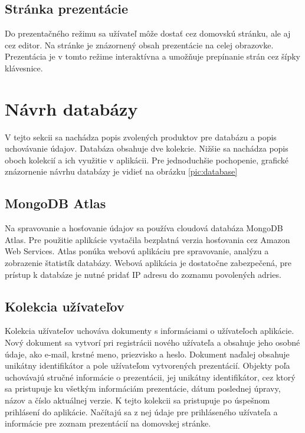\subsection*{Stránka prezentácie}
Do prezentačného režimu sa užívateľ môže dostať cez domovskú stránku, ale aj cez editor. Na stránke je znázornený obsah prezentácie na celej obrazovke. Prezentácia je v tomto režime interaktívna a umožňuje prepínanie strán cez šípky klávesnice.

\section{Návrh databázy}
\label{navrhdb}
V tejto sekcii sa nachádza popis zvolených produktov pre databázu a popis uchovávanie údajov. Databáza obsahuje dve kolekcie. Nižšie sa nachádza popis oboch kolekcií a ich využitie v aplikácii. Pre jednoduchšie pochopenie, grafické znázornenie návrhu databázy je vidieť na obrázku \ref{pic:database}

\subsection*{MongoDB Atlas}
Na spravovanie a hosťovanie údajov sa používa cloudová databáza MongoDB Atlas. Pre použitie aplikácie vystačila bezplatná verzia hosťovania cez Amazon Web Services. Atlas ponúka webovú aplikáciu pre spravovanie, analýzu a zobrazenie štatistík databázy. Webová aplikácia je dostatočne zabezpečená, pre prístup k databáze je nutné pridať IP adresu do zoznamu povolených adries.  

\subsection*{Kolekcia užívateľov}
Kolekcia užívateľov uchováva dokumenty s informáciami o užívateľoch aplikácie. Nový dokument sa vytvorí pri registrácii nového užívateľa a obsahuje jeho osobné údaje, ako e-mail, krstné meno, priezvisko a heslo. Dokument naďalej obsahuje unikátny identifikátor a pole užívateľom vytvorených prezentácií. Objekty poľa uchovávajú stručné informácie o prezentácii, jej unikátny identifikátor, cez ktorý sa pristupuje ku všetkým informáciám prezentácie, dátum poslednej úpravy, názov a číslo aktuálnej verzie. K tejto kolekcii sa pristupuje po úspešnom prihlásení do aplikácie. Načítajú sa z nej údaje pre prihláseného užívateľa a informácie pre zoznam prezentácií na domovskej stránke. 

